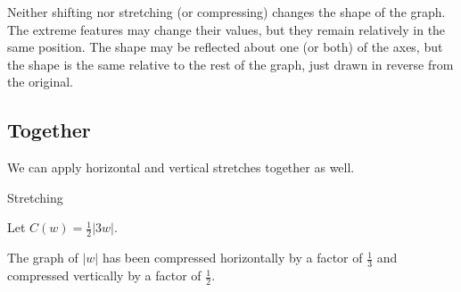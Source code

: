 \documentclass{ximera}
\begin{document}
Neither shifting nor stretching (or compressing) changes the shape of the graph.  The extreme features may change their values, but they remain relatively in the same position.  The shape may be reflected about one (or both) of the axes, but the shape is the same relative to the rest of the graph, just drawn in reverse from the original.













\subsection*{Together}

We can apply horizontal and vertical stretches together as well.





\begin{example}  Stretching

Let $C(w) = \frac{1}{2}|3w|$.


\begin{image}
\end{image}

\end{example}

The graph of $|w|$ has been compressed horizontally by a factor of $\frac{1}{3}$ and compressed vertically by a factor of $\frac{1}{2}$.
\end{document}
